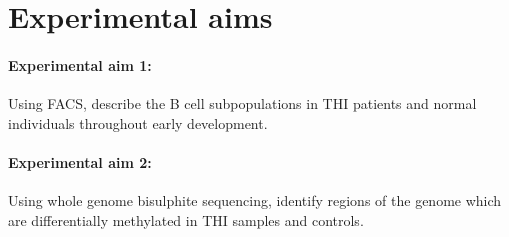 \documentclass[12pt]{article}
\newcommand{\naive}{na\"{i}ve }
\begin{document}
%
%		
%			
%		
%	
			
	\section{Experimental aims}
		
		\paragraph{Experimental aim 1:} Using FACS, describe the B cell subpopulations in THI patients and normal individuals throughout early development.
		
		
		\paragraph{Experimental aim 2:} Using whole genome bisulphite sequencing, identify regions of the genome which are differentially methylated in THI samples and controls.
		
\end{document}
